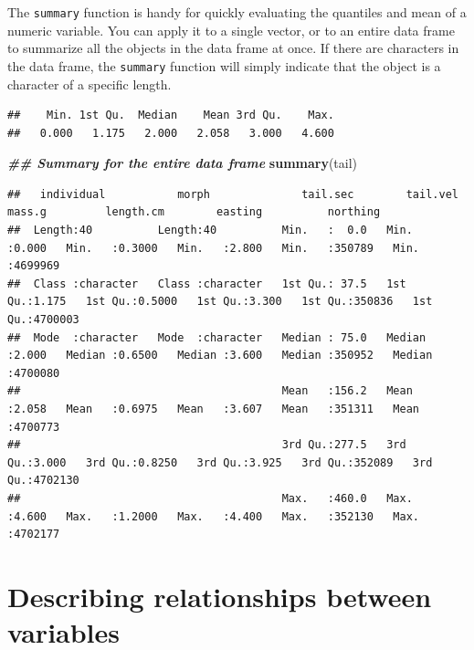 \documentclass[
]{book}
\newenvironment{Shaded}{\begin{snugshade}}{\end{snugshade}}
\newcommand{\DocumentationTok}[1]{\textcolor[rgb]{0.56,0.35,0.01}{\textbf{\textit{#1}}}}
\newcommand{\FunctionTok}[1]{\textcolor[rgb]{0.13,0.29,0.53}{\textbf{#1}}}
\newcommand{\NormalTok}[1]{#1}
\newcommand{\SpecialCharTok}[1]{\textcolor[rgb]{0.81,0.36,0.00}{\textbf{#1}}}
\begin{document}
The \texttt{summary} function is handy for quickly evaluating the quantiles and mean of a numeric variable. You can apply it to a single vector, or to an entire data frame to summarize all the objects in the data frame at once. If there are characters in the data frame, the \texttt{summary} function will simply indicate that the object is a character of a specific length.

\begin{Shaded}
\end{Shaded}

\begin{verbatim}
##    Min. 1st Qu.  Median    Mean 3rd Qu.    Max. 
##   0.000   1.175   2.000   2.058   3.000   4.600
\end{verbatim}

\begin{Shaded}
\begin{Highlighting}[]
\DocumentationTok{\#\# Summary for the entire data frame}
\FunctionTok{summary}\NormalTok{(tail)}
\end{Highlighting}
\end{Shaded}

\begin{verbatim}
##   individual           morph              tail.sec        tail.vel         mass.g         length.cm        easting          northing      
##  Length:40          Length:40          Min.   :  0.0   Min.   :0.000   Min.   :0.3000   Min.   :2.800   Min.   :350789   Min.   :4699969  
##  Class :character   Class :character   1st Qu.: 37.5   1st Qu.:1.175   1st Qu.:0.5000   1st Qu.:3.300   1st Qu.:350836   1st Qu.:4700003  
##  Mode  :character   Mode  :character   Median : 75.0   Median :2.000   Median :0.6500   Median :3.600   Median :350952   Median :4700080  
##                                        Mean   :156.2   Mean   :2.058   Mean   :0.6975   Mean   :3.607   Mean   :351311   Mean   :4700773  
##                                        3rd Qu.:277.5   3rd Qu.:3.000   3rd Qu.:0.8250   3rd Qu.:3.925   3rd Qu.:352089   3rd Qu.:4702130  
##                                        Max.   :460.0   Max.   :4.600   Max.   :1.2000   Max.   :4.400   Max.   :352130   Max.   :4702177
\end{verbatim}

\section{Describing relationships between variables}\label{describing-relationships-between-variables}
\end{document}
